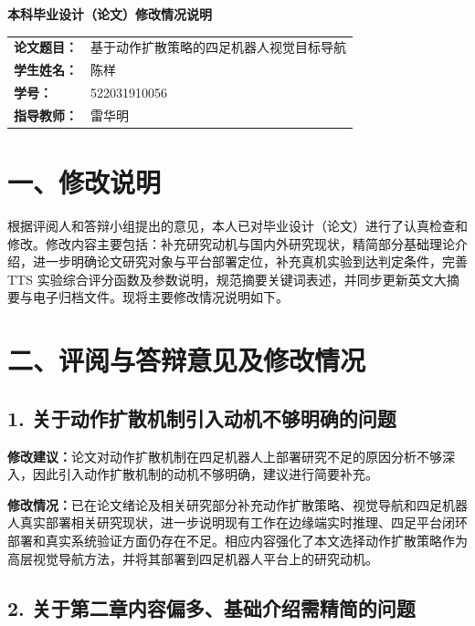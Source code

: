 \documentclass[UTF8,zihao=-4]{ctexart}
\begin{document}
\begin{center}
    {\bfseries 本科毕业设计（论文）修改情况说明}
\end{center}

\vspace{1em}

\begin{tabular}{>{\bfseries}p{3cm}p{11cm}}
论文题目： & 基于动作扩散策略的四足机器人视觉目标导航 \\
学生姓名： & 陈样 \\
学号： & 522031910056 \\
指导教师： & 雷华明 \\
\end{tabular}

\section*{一、修改说明}

根据评阅人和答辩小组提出的意见，本人已对毕业设计（论文）进行了认真检查和修改。修改内容主要包括：补充研究动机与国内外研究现状，精简部分基础理论介绍，进一步明确论文研究对象与平台部署定位，补充真机实验到达判定条件，完善 TTS 实验综合评分函数及参数说明，规范摘要关键词表述，并同步更新英文大摘要与电子归档文件。现将主要修改情况说明如下。

\section*{二、评阅与答辩意见及修改情况}

\subsection*{1. 关于动作扩散机制引入动机不够明确的问题}

\noindent\textbf{修改建议：}论文对动作扩散机制在四足机器人上部署研究不足的原因分析不够深入，因此引入动作扩散机制的动机不够明确，建议进行简要补充。

\noindent\textbf{修改情况：}已在论文绪论及相关研究部分补充动作扩散策略、视觉导航和四足机器人真实部署相关研究现状，进一步说明现有工作在边缘端实时推理、四足平台闭环部署和真实系统验证方面仍存在不足。相应内容强化了本文选择动作扩散策略作为高层视觉导航方法，并将其部署到四足机器人平台上的研究动机。

\subsection*{2. 关于第二章内容偏多、基础介绍需精简的问题}
\end{document}
